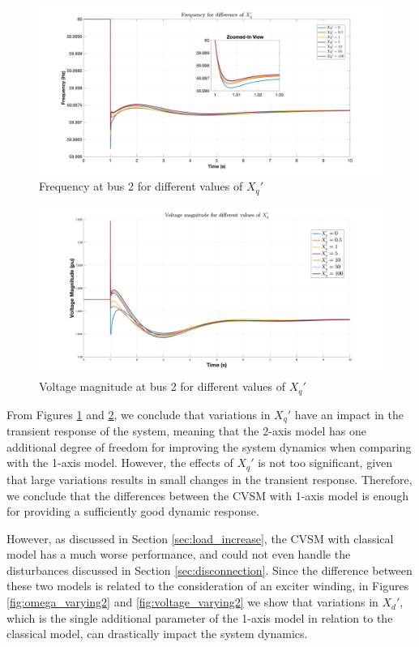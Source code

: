 \begin{figure}[ht!]
    \centering
    \includegraphics[width = \linewidth]{images/omega_varying.png}
    \caption{Frequency at bus 2 for different values of $X_q'$}
    \label{fig:omega_varying}
\end{figure}

\begin{figure}[ht!]
    \centering
    \includegraphics[width = \linewidth]{images/voltage_varying.png}
    \caption{Voltage magnitude at bus 2 for different values of $X_q'$}
    \label{fig:voltage_varying}
\end{figure}

From Figures \ref{fig:omega_varying} and \ref{fig:voltage_varying}, we conclude
that variations in $X_q'$ have an impact in the transient response of the
system, meaning that the 2-axis model has one additional degree of freedom for
improving the system dynamics when comparing with the 1-axis model. However, the
effects of $X_q'$ is not too significant, given that large variations results in
small changes in the transient response. Therefore, we conclude that the
differences between the CVSM with 1-axis model is enough for providing a
sufficiently good dynamic response.

However, as discussed in Section \ref{sec:load_increase}, the CVSM with
classical model has a much worse performance, and could not even handle the
disturbances discussed in Section \ref{sec:disconnection}. Since the difference
between these two models is related to the consideration of an exciter winding,
in Figures \ref{fig:omega_varying2} and \ref{fig:voltage_varying2} we show that
variations in $X_d'$, which is the single additional parameter of the 1-axis
model in relation to the classical model, can drastically impact the system
dynamics.

